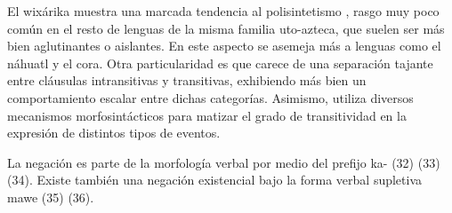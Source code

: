 El wixárika muestra una marcada tendencia al polisintetismo \textcolor{MidnightBlue}{\citep{Huichol}}, rasgo muy poco común en el resto de lenguas de la misma familia uto-azteca, que suelen ser más bien aglutinantes o aislantes. En este aspecto se asemeja más a lenguas como el náhuatl y el cora. Otra particularidad es que carece de una separación tajante entre cláusulas intransitivas y transitivas, exhibiendo más bien un comportamiento escalar entre dichas categorías. Asimismo, utiliza diversos mecanismos morfosintácticos para matizar el grado de transitividad en la expresión de distintos tipos de eventos.

La negación es parte de la morfología verbal por medio del prefijo {\setmainfont{Doulos SIL} ka-} (32) (33) (34). Existe también una negación existencial bajo la forma verbal supletiva {\setmainfont{Doulos SIL} mawe} (35) (36).